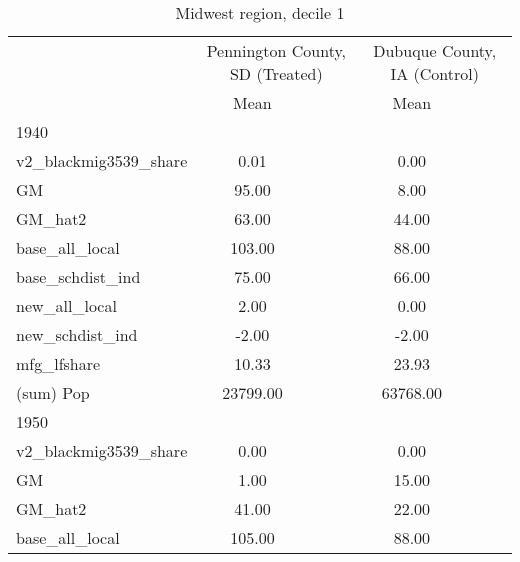 \begin{table}[htbp]\centering
\def\sym#1{\ifmmode^{#1}\else\(^{#1}\)\fi}
\caption{Midwest region, decile 1 \label{tab1}}
\begin{tabular}{l*{2}{ccc}}
\toprule
                    &\multicolumn{3}{c}{Pennington County, SD (Treated)}&\multicolumn{3}{c}{Dubuque County, IA (Control)}\\
                    &        Mean&            &            &        Mean&            &            \\
\midrule
1940                &            &            &            &            &            &            \\
v2\_blackmig3539\_share&        0.01&            &            &        0.00&            &            \\
GM                  &       95.00&            &            &        8.00&            &            \\
GM\_hat2             &       63.00&            &            &       44.00&            &            \\
base\_all\_local      &      103.00&            &            &       88.00&            &            \\
base\_schdist\_ind    &       75.00&            &            &       66.00&            &            \\
new\_all\_local       &        2.00&            &            &        0.00&            &            \\
new\_schdist\_ind     &       -2.00&            &            &       -2.00&            &            \\
mfg\_lfshare         &       10.33&            &            &       23.93&            &            \\
(sum) Pop           &    23799.00&            &            &    63768.00&            &            \\
\midrule
1950                &            &            &            &            &            &            \\
v2\_blackmig3539\_share&        0.00&            &            &        0.00&            &            \\
GM                  &        1.00&            &            &       15.00&            &            \\
GM\_hat2             &       41.00&            &            &       22.00&            &            \\
base\_all\_local      &      105.00&            &            &       88.00&            &            \\

\end{tabular}
\end{table}

